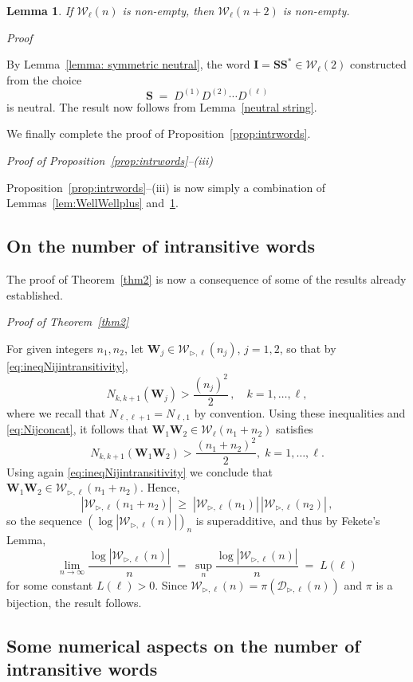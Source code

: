 \documentclass[reqno,a4paper,11pt]{amsart}
\makeatletter
\newcommand{\btt}{\triangleright}
\newtheorem{lemma}{Lemma}
\theoremstyle{remark}
\newcommand{\mc}[1]{{\mathcal #1}}
\newcommand{\mb}[1]{{\mathbf #1}}
\numberwithin{equation}{section}
\renewenvironment{proof}[1][Proof]{\par
\pushQED{\qed}%
\normalfont \topsep6\p@\@plus6\p@\relax
\trivlist
\item\relax
{\itshape
#1\@addpunct{.}}\hspace\labelsep\ignorespaces
}{%
\popQED\endtrivlist\@endpefalse
}
\makeatother
\begin{document}
\begin{lemma}\label{lem:WnWnplusplus}
If $\mc W_\ell(n)$ is non-empty, then $\mc W_{\ell}(n+2)$ is non-empty.
\end{lemma}
\begin{proof}
By Lemma~\ref{lemma: symmetric neutral}, the word $\mb I=\mb S\mb S^*\in \mc W_{\ell}(2)$ constructed from the choice
%
$$
\mb S\;=\;D^{(1)}D^{(2)}\cdots D^{(\ell)}
$$
%
is neutral. The result now follows from Lemma~\ref{neutral string}.
\end{proof}

We finally complete the proof of Proposition~\ref{prop:intrwords}.

\begin{proof}[Proof of Proposition~\ref{prop:intrwords}--(iii)]
Proposition~\ref{prop:intrwords}--(iii) is now simply a combination of Lemmas~\ref{lem:WellWellplus} and~\ref{lem:WnWnplusplus}.
\end{proof}

\subsection{On the number of intransitive words}\hfill

The proof of Theorem~\ref{thm2} is now a consequence of some of the results already established.
\begin{proof}[Proof of Theorem~\ref{thm2}]
For given integers $n_1,n_2$, let $\mb W_j\in \mc W_{\btt,\ell}(n_j)$, $j=1,2$, so that by \eqref{eq:ineqNijintransitivity},
%
$$
N_{k,k+1}(\mb W_j)>\frac{(n_j)^2}{2}\,, \quad k=1,\hdots, \ell,$$
%
where we recall that $N_{\ell,\ell+1}=N_{\ell,1}$ by convention. Using these inequalities and \eqref{eq:Nijconcat}, it follows that $\mb W_1\mb W_2\in \mc W_\ell(n_1+n_2)$ satisfies
%
$$
N_{k,k+1}(\mb W_1\mb W_2)>\frac{(n_1+n_2)^2}{2}, \; k=1,\hdots, \ell.
$$
%
Using again \eqref{eq:ineqNijintransitivity} we conclude that $\mb W_1\mb W_2\in \mc W_{\btt,\ell}(n_1+n_2)$. Hence,
%
$$
|\mc W_{\btt,\ell}(n_1+n_2)|\;\geq\; |\mc W_{\btt,\ell}(n_1)|\,|\mc W_{\btt,\ell}(n_2)|\,,
$$
%
so the sequence $(\log |\mc W_{\btt,\ell}(n)|)_n$ is superadditive, and thus by Fekete's Lemma,
%
$$
\lim_{n\to \infty} \frac{ \log|\mc W_{\btt,\ell}(n)|}{n}\;=\;\sup_n \frac{ \log|\mc W_{\btt,\ell}(n)|}{n}\;=\;L(\ell)
$$
%
for some constant $L(\ell)>0$. Since $\mc W_{\btt,\ell}(n)=\pi(\mc D_{\btt,\ell}(n))$ and $\pi$ is a bijection, the result follows.
\end{proof}

\subsection{Some numerical aspects on the number of intransitive words}\label{sec:numerics}\hfill
\end{document}
